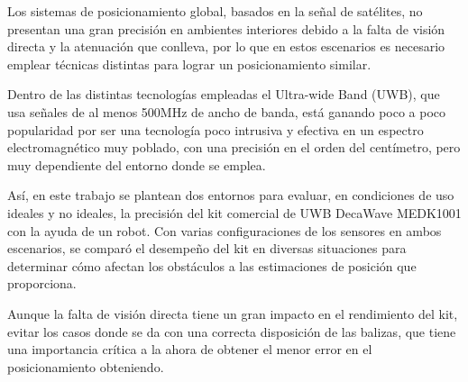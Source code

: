 Los sistemas de posicionamiento global, basados en la señal de satélites, no presentan una gran precisión en ambientes interiores debido a la falta de visión directa y la atenuación que conlleva, por lo que en estos escenarios es necesario emplear técnicas distintas para lograr un posicionamiento similar.

Dentro de las distintas tecnologías empleadas el Ultra-wide Band (UWB), que usa señales de al menos 500MHz de ancho de banda, está ganando poco a poco popularidad por ser una tecnología poco intrusiva y efectiva en un espectro electromagnético muy poblado, con una precisión en el orden del centímetro, pero muy dependiente del entorno donde se emplea.

Así, en este trabajo se plantean dos entornos para evaluar, en condiciones de uso ideales y no ideales, la precisión del kit comercial de UWB DecaWave MEDK1001 con la ayuda de un robot.
Con varias configuraciones de los sensores en ambos escenarios, se comparó el desempeño del kit en diversas situaciones para determinar cómo afectan los obstáculos a las estimaciones de posición que proporciona.

Aunque la falta de visión directa tiene un gran impacto en el rendimiento del kit, evitar los casos donde se da con una correcta disposición de las balizas, que tiene una importancia crítica a la ahora de obtener el menor error en el posicionamiento obteniendo.